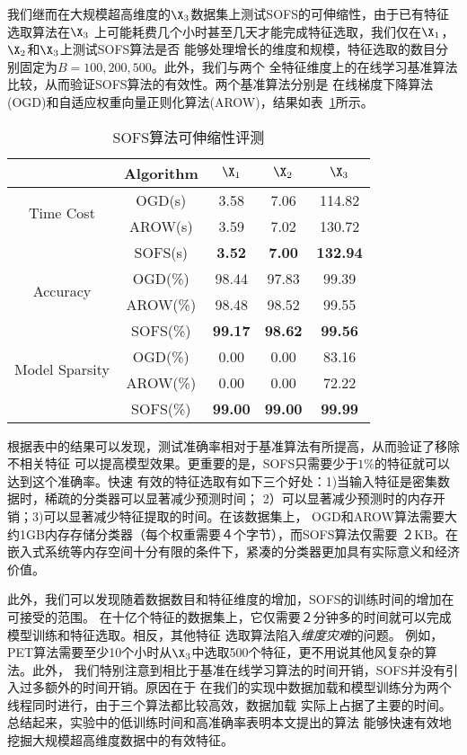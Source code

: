 我们继而在大规模超高维度的$\X_3$数据集上测试SOFS的可伸缩性，由于已有特征选取算法在$\X_3$
上可能耗费几个小时甚至几天才能完成特征选取，我们仅在$\X_1$，$\X_2$和$\X_3$上测试SOFS算法是否
能够处理增长的维度和规模，特征选取的数目分别固定为$B=100,200,500$。此外，我们与两个
全特征维度上的在线学习基准算法比较，从而验证SOFS算法的有效性。两个基准算法分别是
在线梯度下降算法(OGD)和自适应权重向量正则化算法(AROW)，结果如表~\ref{tab:sofs-scalability}所示。
\begin{table}[htbp]
    \centering
    \caption{SOFS算法可伸缩性评测}
    \label{tab:sofs-scalability}
    \begin{tabular}{|c|c|c|c|c|}
        \hline
        & Algorithm & $\X_1$ & $\X_2$ & $\X_3$  \\
        \hline
        \multirow{2}{*}{Time Cost} & OGD(s) & 3.58 & 7.06 & 114.82 \\
        & AROW(s) & 3.59 & 7.02 & 130.72 \\
        & SOFS(s) & \textbf{3.52} & \textbf{7.00} & \textbf{132.94} \\
        \hline
        \multirow{2}{*}{Accuracy} & OGD(\%) & 98.44 & 97.83 & 99.39 \\
        & AROW(\%) & 98.48 & 98.52 & 99.55 \\
        & SOFS(\%) & \textbf{99.17} & \textbf{98.62} & \textbf{99.56} \\
        \hline
        \multirow{2}{*}{Model Sparsity} & OGD(\%) & 0.00 & 0.00 & 83.16 \\
        & AROW(\%) & 0.00 & 0.00 & 72.22 \\
        & SOFS(\%) & \textbf{99.00} & \textbf{99.00} & \textbf{99.99} \\
        \hline
    \end{tabular}
\end{table}
根据表中的结果可以发现，测试准确率相对于基准算法有所提高，从而验证了移除不相关特征
可以提高模型效果。更重要的是，SOFS只需要少于$1\%$的特征就可以达到这个准确率。快速
有效的特征选取有如下三个好处：1)当输入特征是密集数据时，稀疏的分类器可以显著减少预测时间；
2）可以显著减少预测时的内存开销；3)可以显著减少特征提取的时间。在该数据集上，
OGD和AROW算法需要大约1GB内存存储分类器（每个权重需要４个字节），而SOFS算法仅需要
２KB。在嵌入式系统等内存空间十分有限的条件下，紧凑的分类器更加具有实际意义和经济价值。

此外，我们可以发现随着数据数目和特征维度的增加，SOFS的训练时间的增加在可接受的范围。
在十亿个特征的数据集上，它仅需要２分钟多的时间就可以完成模型训练和特征选取。相反，其他特征
选取算法陷入\emph{维度灾难}的问题。
例如，PET算法需要至少10个小时从$\X_3$中选取500个特征，更不用说其他风复杂的算法。此外，
我们特别注意到相比于基准在线学习算法的时间开销，SOFS并没有引入过多额外的时间开销。原因在于
在我们的实现中数据加载和模型训练分为两个线程同时进行，由于三个算法都比较高效，数据加载
实际上占据了主要的时间。总结起来，实验中的低训练时间和高准确率表明本文提出的算法
能够快速有效地挖掘大规模超高维度数据中的有效特征。

